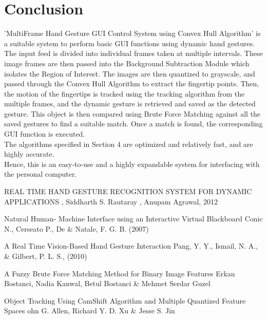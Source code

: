 \documentclass{scrreprt}
\begin{document}
\chapter{Conclusion}
'MultiFrame Hand Gesture GUI Control System using Convex Hull Algorithm' is a suitable system to perform basic GUI functions using dynamic hand gestures. 
\\

The input feed is divided into individual frames taken at multiple intervals. These image frames are then passed into the Background Subtraction Module which isolates the Region of Interest.
The images are then quantized to grayscale, and passed through the Convex Hull Algorithm to extract the fingertip points.
Then, the motion of the fingertips is tracked using the tracking algorithm from the multiple frames, and the dynamic gesture is retrieved and saved as the detected gesture.
This object is then compared using Brute Force Matching against all the saved gestures to find a suitable match. Once a match is found, the corresponding GUI function is executed.
\\

The algorithms specified in Section 4 are optimized and relatively fast, and are highly accurate.
\\

Hence, this is an easy-to-use and a highly expandable system for interfacing with the personal computer.
\begin{thebibliography}{999}

\bibitem{ } REAL TIME HAND GESTURE RECOGNITION
SYSTEM FOR DYNAMIC APPLICATIONS , Siddharth S. Rautaray , Anupam Agrawal, 2012

\bibitem{ } Natural Human- Machine Interface using an Interactive Virtual Blackboard
Conic N., Cerseato P., De \& Natale, F. G. B. (2007)
 
\bibitem{ } A Real Time Vision-Based Hand Gesture Interaction
Pang, Y. Y., Ismail, N. A., \& Gilbert, P. L. S., (2010)

\bibitem{ } A Fuzzy Brute Force Matching Method for Binary Image Features 
Erkan Bostanci, Nadia Kanwal, Betul Bostanci \& Mehmet Serdar Guzel

\bibitem{ } Object Tracking Using CamShift Algorithm and Multiple Quantized Feature Spaces 
ohn G. Allen, Richard Y. D. Xu \& Jesse S. Jin 

\end{thebibliography}
\end{document}
